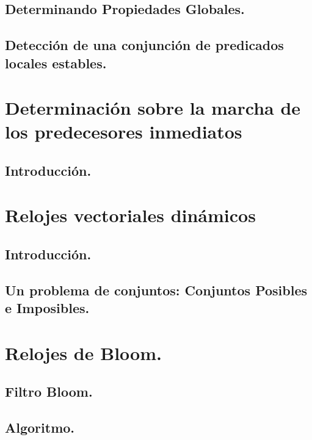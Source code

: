 \documentclass[9pt]{beamer}
\begin{document}
\subsection{Determinando Propiedades Globales.}


\subsection{Detección de una conjunción de predicados locales estables.}



\section{Determinación sobre la marcha de los predecesores inmediatos}
\subsection{Introducción.}





\section{Relojes vectoriales dinámicos}
\subsection{Introducción.}



\subsection{Un problema de conjuntos: Conjuntos Posibles e Imposibles.}

\section{Relojes de Bloom.}
\subsection{Filtro Bloom.}



\subsection{Algoritmo.}



\end{document}

